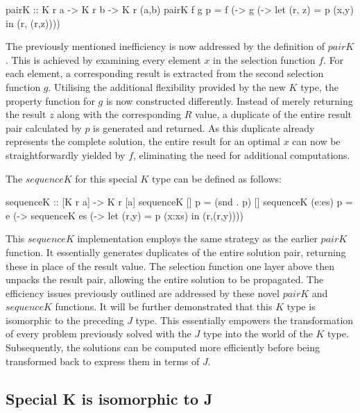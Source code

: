 \documentclass[runningheads]{llncs}
\begin{document}
\begin{code}
pairK :: K r a -> K r b -> K r (a,b)
pairK f g p = f (\x -> 
              g (\y -> let (r, z) = p (x,y) 
                       in (r, (r,z))))
\end{code}

The previously mentioned inefficiency is now addressed by the definition
of \(pairK\). This is achieved by examining every element \(x\) in the
selection function \(f\). For each element, a corresponding result is
extracted from the second selection function \(g\). Utilising the
additional flexibility provided by the new \(K\) type, the property
function for \(g\) is now constructed differently. Instead of merely
returning the result \(z\) along with the corresponding \(R\) value, a
duplicate of the entire result pair calculated by \(p\) is generated and
returned. As this duplicate already represents the complete solution,
the entire result for an optimal \(x\) can now be straightforwardly
yielded by \(f\), eliminating the need for additional computations.

\qquad The \(sequenceK\) for this special \(K\) type can be defined as
follows:

\begin{code}
sequenceK :: [K r a] -> K r [a]
sequenceK [] p     = (snd . p) []
sequenceK (e:es) p = e (\x -> sequenceK es 
                       (\xs -> let (r,y) = p (x:xs) 
                               in (r,(r,y))))
\end{code}

This \(sequenceK\) implementation employs the same strategy as the
earlier \(pairK\) function. It essentially generates duplicates of the
entire solution pair, returning these in place of the result value. The
selection function one layer above then unpacks the result pair,
allowing the entire solution to be propagated. The efficiency issues
previously outlined are addressed by these novel \(pairK\) and
\(sequenceK\) functions. It will be further demonstrated that this \(K\)
type is isomorphic to the preceding \(J\) type. This essentially
empowers the transformation of every problem previously solved with the
\(J\) type into the world of the \(K\) type. Subsequently, the solutions
can be computed more efficiently before being transformed back to
express them in terms of \(J\).

\subsection{Special K is isomorphic to
J}\label{special-k-is-isomorphic-to-j}
\end{document}
